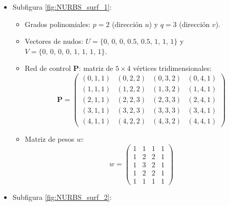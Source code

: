 \documentclass[11pt]{book}
\theoremstyle{plain} %
\theoremstyle{definition} %
\theoremstyle{definition} %
\begin{document}
\begin{itemize}
    \item Subfigura \ref{fig:NURBS_surf_1}:
    \begin{itemize}
        \item Grados polinomiales: $p = 2$ (dirección $u$) y $q = 3$ (dirección $v$).
        \item Vectores de nudos: $U = \{0,\, 0,\, 0,\, 0.5,\, 0.5,\, 1,\, 1,\, 1\}$ y $V = \{0,\, 0,\, 0,\, 0,\, 1,\, 1,\, 1,\, 1\}$.
        \item Red de control $\mathbf{P}$: matriz de $5 \times 4$ vértices tridimensionales:
        \begin{equation*}
            \mathbf{P} = \begin{pmatrix}
                (0, 1, 1) & (0, 2, 2) & (0, 3, 2) & (0, 4, 1) \\
                (1, 1, 1) & (1, 2, 2) & (1, 3, 2) & (1, 4, 1) \\
                (2, 1, 1) & (2, 2, 3) & (2, 3, 3) & (2, 4, 1) \\
                (3, 1, 1) & (3, 2, 3) & (3, 3, 3) & (3, 4, 1) \\
                (4, 1, 1) & (4, 2, 2) & (4, 3, 2) & (4, 4, 1)
            \end{pmatrix}
        \end{equation*}
        \item Matriz de pesos $w$:
        \begin{equation*}
            w = \begin{pmatrix}
                1 & 1 & 1 & 1 \\
                1 & 2 & 2 & 1 \\
                1 & 3 & 2 & 1 \\
                1 & 2 & 2 & 1 \\
                1 & 1 & 1 & 1
            \end{pmatrix}
        \end{equation*}
    \end{itemize}
    \item Subfigura \ref{fig:NURBS_surf_2}: 
\end{itemize}
\end{document}
